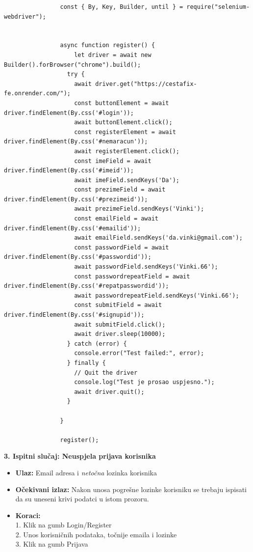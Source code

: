 			\begin{verbatim}
				const { By, Key, Builder, until } = require("selenium-webdriver");


				async function register() {
					let driver = await new Builder().forBrowser("chrome").build();
				  try {
					await driver.get("https://cestafix-fe.onrender.com/");
					const buttonElement = await driver.findElement(By.css('#login'));
					await buttonElement.click();
					const registerElement = await driver.findElement(By.css('#nemaracun'));
					await registerElement.click();
					const imeField = await driver.findElement(By.css('#imeid'));
					await imeField.sendKeys('Da');
					const prezimeField = await driver.findElement(By.css('#prezimeid'));
					await prezimeField.sendKeys('Vinki');
					const emailField = await driver.findElement(By.css('#emailid'));
					await emailField.sendKeys('da.vinki@gmail.com');
					const passwordField = await driver.findElement(By.css('#passwordid'));
					await passwordField.sendKeys('Vinki.66');
					const passwordrepeatField = await driver.findElement(By.css('#repatpasswordid'));
					await passwordrepeatField.sendKeys('Vinki.66');
					const submitField = await driver.findElement(By.css('#signupid'));
					await submitField.click();
					await driver.sleep(10000);
				  } catch (error) {
					console.error("Test failed:", error);
				  } finally {
					// Quit the driver
					console.log("Test je prosao uspjesno.");
					await driver.quit();
				  }
				
				}
				
				register();				
			\end{verbatim}

			\textbf{3. Ispitni slučaj: Neuspjela prijava korisnika}
			 \begin{itemize}
				\item \textbf{Ulaz:} Email adresa i \textit{netočna} lozinka korisnika
				\item \textbf{Očekivani izlaz:} Nakon unosa pogrešne lozinke korisniku se trebaju ispisati da su uneseni krivi podatci u istom prozoru.
				\item \textbf{Koraci:} 
				\\ 1. Klik na gumb Login/Register
				\\ 2. Unos korisničnih podataka, točnije emaila i lozinke
				\\ 3. Klik na gumb Prijava
			\end{itemize}

